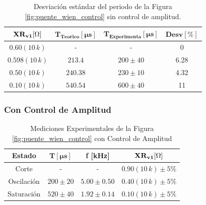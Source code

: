             \begin{table}[H]
              \centering
              \begin{tabular}{|c|c|c|c|}
                \hline
                $\mathbf{XR_{v1} [\ohm]}$ & $\mathbf{T_{Teorico} [\mu s]}$ & $\mathbf{T_{Experimenta}[\mu s]}$ & $\mathbf{Desv [\%]}$ \\
                \hline
                $0.60(10 \, k)$ & - & - & 0 \\
                \hline
                $0.598(10 \, k)$ & $213.4$ & $200 \pm 40$ & 6.28 \\
                \hline
                $0.50(10 \, k)$ & $240.38$ & $230 \pm 10$ & 4.32 \\
                \hline
                $0.10(10 \, k)$ & $540.54$ & $600 \pm 40$ & 11 \\
                \hline
              \end{tabular}
              \caption{Desviación estándar del periodo de la Figura \ref{fig:puente_wien_control} sin control de amplitud.}
              \label{tab:desviacion_puente_wien_sc}
            \end{table}
            


        \subsubsection{Con Control de Amplitud}

            \begin{table}[H]
              \centering
              \begin{tabular}{|c|c|c|c|}
                \hline
                \textbf{Estado} & $\mathbf{T [\mu s]}$ & \textbf{f [kHz]} & $\mathbf{XR_{v1} [\ohm]}$ \\
                \hline
                Corte & - & - & $0.90(10 \, k) \pm 5 \%$ \\
                \hline
                Oscilación & $200 \pm 20$ & $5.00 \pm 0.50$ & $0.40(10 \, k) \pm 5 \%$ \\
                \hline
                Saturación & $520 \pm 40$ & $1.92 \pm 0.14$ & $0.10(10 \, k) \pm 5 \%$ \\
                \hline
              \end{tabular}
              \caption{Mediciones Experimentales de la Figura \ref{fig:puente_wien_control} con Control de Amplitud}
              \label{tab:exp_puente_wien_control}
            \end{table}

